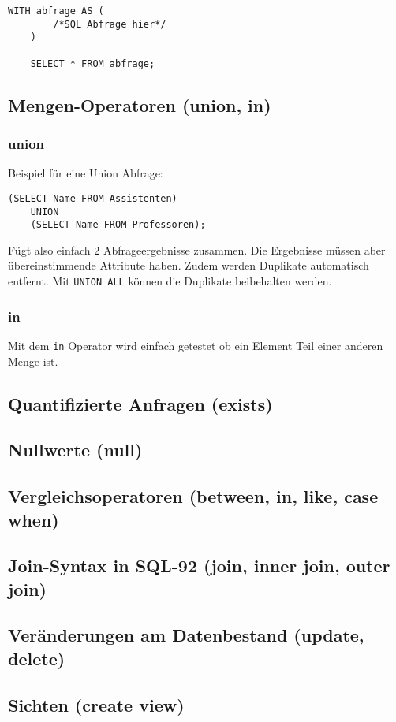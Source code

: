 \begin{lstlisting}[caption={with Operator},label=lst:with]
	WITH abfrage AS (
	    /*SQL Abfrage hier*/
	)
	
	SELECT * FROM abfrage;
\end{lstlisting}


\subsection{Mengen-Operatoren (union, in)}\label{sec:mengen_operatoren}

\subsubsection{union}
Beispiel für eine Union Abfrage:

\begin{lstlisting}[caption={Union Abfrage Beispiel},label=lst:union_bsp]
	(SELECT Name FROM Assistenten)
	UNION
	(SELECT Name FROM Professoren);
\end{lstlisting}

Fügt also einfach 2 Abfrageergebnisse zusammen. Die Ergebnisse müssen aber übereinstimmende Attribute haben. Zudem werden Duplikate automatisch entfernt. Mit \texttt{UNION ALL} können die Duplikate beibehalten werden.

\subsubsection{in}

Mit dem \texttt{in} Operator wird einfach getestet ob ein Element Teil einer anderen Menge ist. 

\subsection{Quantifizierte Anfragen (exists)}
\subsection{Nullwerte (null)}
\subsection{Vergleichsoperatoren (between, in, like, case when)}
\subsection{Join-Syntax in SQL-92 (join, inner join, outer join)}
\subsection{Veränderungen am Datenbestand (update, delete)}
\subsection{Sichten (create view)}